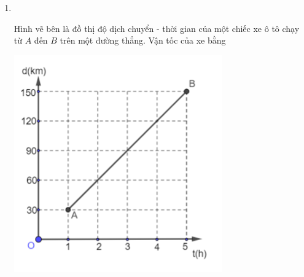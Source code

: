 \begin{enumerate}[label=\bfseries Câu \arabic*:]
\item {}\\
{\begin{minipage}[l]{0.6\textwidth}
		Hình vẽ bên là đồ thị độ dịch chuyển - thời gian của một chiếc xe ô tô chạy từ $A$ đến $B$ trên một đường thẳng. Vận tốc của xe bằng
	\end{minipage}
\begin{minipage}{0.4\textwidth}
		\begin{center}
			\includegraphics[width=0.6\linewidth]{../figs/VN10-2023-PH-TP005-P-5}
		\end{center}
	\end{minipage}
}



\end{enumerate}
